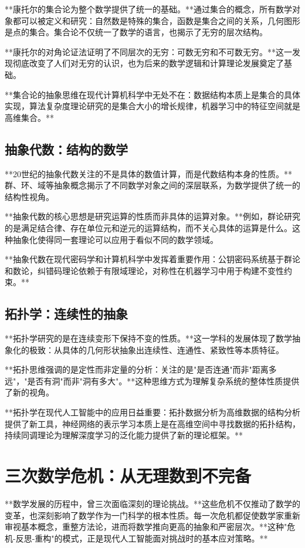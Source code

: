 **康托尔的集合论为整个数学提供了统一的基础。**通过集合的概念，所有数学对象都可以被定义和研究：自然数是特殊的集合，函数是集合之间的关系，几何图形是点的集合。集合论不仅统一了数学的语言，也揭示了无穷的层次结构。

**康托尔的对角论证法证明了不同层次的无穷：可数无穷和不可数无穷。**这一发现彻底改变了人们对无穷的认识，也为后来的数学逻辑和计算理论发展奠定了基础。

**集合论的抽象思维在现代计算机科学中无处不在：数据结构本质上是集合的具体实现，算法复杂度理论研究的是集合大小的增长规律，机器学习中的特征空间就是高维集合。**

\subsection{抽象代数：结构的数学}

**20世纪的抽象代数关注的不是具体的数值计算，而是代数结构本身的性质。**群、环、域等抽象概念揭示了不同数学对象之间的深层联系，为数学提供了统一的结构性视角。

**抽象代数的核心思想是研究运算的性质而非具体的运算对象。**例如，群论研究的是满足结合律、存在单位元和逆元的运算结构，而不关心具体的运算是什么。这种抽象化使得同一套理论可以应用于看似不同的数学领域。

**抽象代数在现代密码学和计算机科学中发挥着重要作用：公钥密码系统基于群论和数论，纠错码理论依赖于有限域理论，对称性在机器学习中用于构建不变性约束。**

\subsection{拓扑学：连续性的抽象}

**拓扑学研究的是在连续变形下保持不变的性质。**这一学科的发展体现了数学抽象化的极致：从具体的几何形状抽象出连续性、连通性、紧致性等本质特征。

**拓扑思维强调的是定性而非定量的分析：关注的是"是否连通"而非"距离多远"，"是否有洞"而非"洞有多大"。**这种思维方式为理解复杂系统的整体性质提供了新的视角。

**拓扑学在现代人工智能中的应用日益重要：拓扑数据分析为高维数据的结构分析提供了新工具，神经网络的表示学习本质上是在高维空间中寻找数据的拓扑结构，持续同调理论为理解深度学习的泛化能力提供了新的理论框架。**

\section{三次数学危机：从无理数到不完备}

**数学发展的历程中，曾三次面临深刻的理论挑战。**这些危机不仅推动了数学的变革，也深刻影响了数学作为一门科学的根本性质。每一次危机都促使数学家重新审视基本概念，重整方法论，进而将数学推向更高的抽象和严密层次。**这种"危机-反思-重构"的模式，正是现代人工智能面对挑战时的基本应对策略。**

